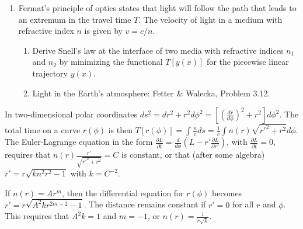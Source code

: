 \documentclass[letterpaper,11pt]{article}
\begin{document}
\begin{enumerate}[resume]
 \item Fermat's principle of optics states that light will follow the path that leads to an extremum in the travel time $T$.  The velocity of light in a medium with refractive index $n$ is given by $v = c/n$.
 \begin{enumerate}
  \item Derive Snell's law at the interface of two media with refractive indices $n_1$ and $n_2$ by minimizing the functional $T[y(x)]$ for the piecewise linear trajectory $y(x)$.
  \item Light in the Earth's atmosphere: Fetter \& Walecka, Problem 3.12.
 \end{enumerate}
\end{enumerate}
In two-dimensional polar coordinates $ds^2 = dr^2 + r^2 d\phi^2 = \left[ \left(\frac{dr}{d\phi}\right)^2 + r^2 \right] d\phi^2$.  The total time on a curve $r(\phi)$ is then $T[r(\phi)] = \int \frac{n}{c} ds = \frac{1}{c} \int n(r) \sqrt{r'^2 + r^2} d\phi$.  The Euler-Lagrange equation in the form $\frac{\partial L}{\partial t} = \frac{d}{d\phi} \left( L - r' \frac{\partial L}{\partial r'} \right)$, with $\frac{\partial L}{\partial t} = 0$, requires that $n(r) \frac{r'}{\sqrt{r'^2 + r^2}} = C$ is constant, or that (after some algebra) $r' = r \sqrt{k n^2 r^2 - 1}$ with $k = C^{-2}$.

If $n(r) = A r^m$, then the differential equation for $r(\phi)$ becomes $r' = r \sqrt{A^2 k r^{2m + 2} - 1}$.  The distance remains constant if $r' = 0$ for all $r$ and $\phi$.  This requires that $A^2 k = 1$ and $m = -1$, or $n(r) = \frac{1}{r\sqrt{k}}$.
\end{document}
